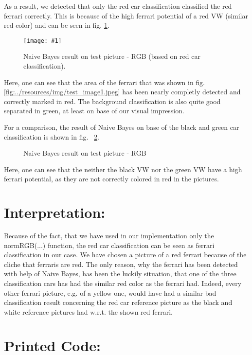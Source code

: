 \documentclass[a4paper,headings=small]{scrartcl}
\numberwithin{equation}{section} %
\numberwithin{figure}{section}   %
\newcommand{\image}[3]{
	\begin{figure}[htbp]
		\centering
		\texttt{[image: \#1]}
		\caption{#3}
		\label{fig:#1}
	\end{figure}
}
\newcommand{\generatedImgRoot}{../resources/img}
\newcommand{\generatedImgRootTwo}{../../../target}
\begin{document}
As a result, we detected that only the red car classification classified the red ferrari correctly.
This is because of the high ferrari potential of a red VW (similar red color)
and can be seen in fig. \ref{fig:\generatedImgRootTwo/1rot_result_ml.png}.

\image{\generatedImgRootTwo/1rot_result_ml.png}{0.8}{%
		Naive Bayes result on test picture - RGB (based on red car classification).}

Here, one can see that the area of the ferrari 
that was shown in fig. \ref{fig:\generatedImgRoot/test_image1.jpeg}
has been nearly completly detected and correctly marked in red.
The background classification is also quite good separated in green,
at least on base of our visual impression.

For a comparison, the result of Naive Bayes on base of the black and green car classification
is shown in fig. ~\ref{fig:label4}.

\begin{figure}
 \hfill
{}
\caption{Naive Bayes result on test picture - RGB}
\label{fig:label4}
\end{figure}

Here, one can see that the neither the black VW nor the green VW have a high ferrari potential,
as they are not correctly colored in red in the pictures.

\section{Interpretation:}

Because of the fact, that we have used in our implementation only the normRGB(...) function,
the red car classification can be seen as ferrari classification in our case.
We have chosen a picture of a red ferrari because of the cliche that ferraris are red.
The only reason, why the ferrari has been detected with help of Naive Bayes,
has been the luckily situation, that one of the three classification cars has had
the similar red color as the ferrari had.
Indeed, every other ferrari picture, e.g. of a yellow one, would have had a similar bad
classification result concerning the red car reference picture 
as the black and white reference pictures had w.r.t. the shown red ferrari.

\newpage
\section{Printed Code:}


\end{document}

